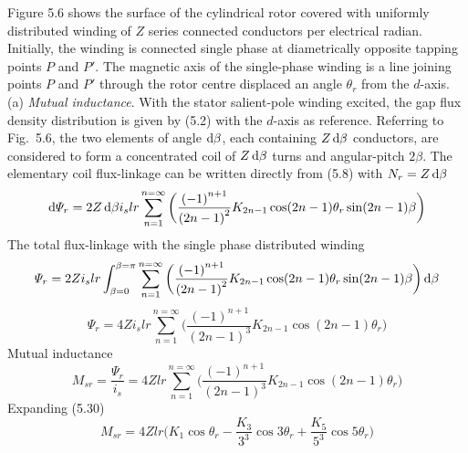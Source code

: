 \documentclass[a4paper,numbers=noenddot,12pt]{scrbook}
\begin{document}
        Figure 5.6 shows the surface of the cylindrical rotor covered with uniformly distributed winding of $Z$ series connected conductors per electrical radian. Initially, the winding is connected single phase at diametrically opposite tapping points $P$ and $P'$. The magnetic axis of the single-phase winding is a line joining points $P$ and $P'$ through the rotor centre displaced an angle $\theta_r$ from the $d$-axis.
        \noindent
        (a) \textit{Mutual inductance}. With the stator salient-pole winding excited, the gap flux density distribution is given by (5.2) with the $d$-axis as reference. Referring to Fig.\ 5.6, the two elements of angle $\dif \beta$, each containing $Z \dif \beta$ conductors, are considered to form a concentrated coil of $Z \dif \beta$ turns and angular-pitch $2 \beta$. The elementary coil flux-linkage can be written directly from (5.8) with $N_r = Z \dif \beta$ 
        \begin{equation}
            \dif \varPsi_r = 2 Z \dif \beta i_s l r \displaystyle \sum_{n = 1}^{n = \infty}\bigg( \frac{{(-1)}^{n + 1}}{{(2n - 1)}^2} K_{2n - 1} \cos(2n -1)\theta_r \sin(2n - 1) \beta \bigg)
        \end{equation}
        The total flux-linkage with the single phase distributed winding
        \begin{equation}
            \varPsi_r = 2Z i_s l r \int_{\beta = 0}^{\beta=\pi} \displaystyle \sum_{n = 1}^{n = \infty} \bigg( \frac{{(-1)}^{n + 1}}{{(2n - 1)}^2} K_{2n - 1} \cos(2n -1)\theta_r \sin(2n - 1) \beta \bigg)\dif \beta
        \end{equation}
        \begin{equation}
            \varPsi_r = 4Z i_s l r \displaystyle \sum_{n = 1}^{n = \infty} \bigg( \frac{{(-1)}^{n + 1}}{{(2n - 1)}^3} K_{2n - 1} \cos(2n -1)\theta_r \bigg)
        \end{equation}
        Mutual inductance
        \begin{equation}
            M_{sr} = \frac{\varPsi_r}{i_s} = 4 Z l r \displaystyle \sum_{n = 1}^{n = \infty} \bigg( \frac{{(-1)}^{n + 1}}{{(2n - 1)}^3} K_{2n - 1} \cos(2n -1)\theta_r \bigg)
        \end{equation}
        Expanding (5.30)
        \begin{equation}
            M_{sr} = 4 Z l r \bigg( K_{1} \cos \theta_r -  \frac{K_{3}}{3^3} \cos 3 \theta_r + \frac{K_{5}}{5^3} \cos 5 \theta_r\bigg)
        \end{equation}
\end{document}
